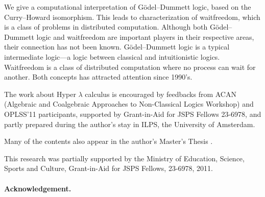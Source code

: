 \documentclass[doctor]{iscs-thesis}
\date{\fix{XXX}}
\begin{document}
\begin{eabstract}
 We give a computational interpretation of G\"odel--Dummett logic, based
 on the Curry--Howard isomorphism.  This leads to characterization
 of waitfreedom, which is a class of problems in distributed
 computation.  Although both G\"odel--Dummett logic and waitfreedom are
 important players in their respective areas, their connection has not
 been known.  G\"odel--Dummett logic is a typical intermediate logic---a
 logic between classical and intuitionistic logics.
 Waitfreedom is a class of distributed computation where no process can
 wait for another.  Both concepts has attracted attention since 1990's.
\end{eabstract}

\begin{jabstract}
 $B%
 $B$k!#$9$k$H!"J,;67W;;$NLdBj%
 $B%
 $B$3$l$i$N4XO"$O!"$3$l$^$GCN$i$l$F$$$J$+$C$?!#(B
\end{jabstract}

\maketitle

\begin{acknowledge}
The work about Hyper $\lambda$ calculus is encouraged by feedbacks from
ACAN (Algebraic and
Coalgebraic
Approaches to
Non-Classical Logics Workshop) and OPLSS'11 participants,
supported by Grant-in-Aid for JSPS Fellows 23-6978,
and partly prepared during the author's stay in
ILPS, the University of Amsterdam.


Many of the contents also appear in the author's Master's Thesis .
\end{acknowledge}

\frontmatter
\tableofcontents

\listoffigures
\listoftables

\mainmatter

%
%


%


This research was partially supported by the Ministry of Education,
Science, Sports and Culture, Grant-in-Aid for JSPS Fellows, 23-6978, 2011.






\paragraph{Acknowledgement.}

\appendix



\end{document}

